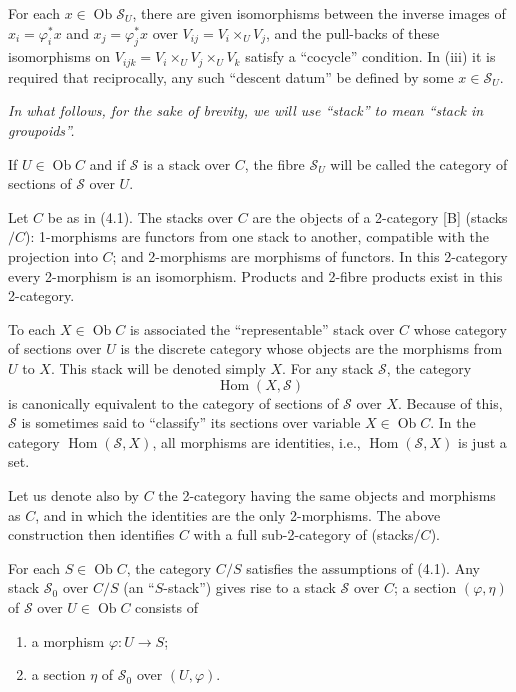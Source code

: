 \documentclass[10pt]{article}
\newcommand{\Hom}{\operatorname{Hom}}
\begin{document}
For each $x\in\operatorname{Ob}\mathscr S_U$, there are given isomorphisms between the inverse images of $x_i=\varphi_i^*x$ and $x_j=\varphi_j^*x$ over $V_{ij}=V_i\times_U V_j$, and the pull-backs of these isomorphisms on $V_{ijk}=V_i\times_U V_j\times_U V_k$ satisfy a ``cocycle'' condition. In (iii) it is required that reciprocally, any such ``descent datum'' be defined by some $x\in\mathscr S_U$.

\emph{In what follows, for the sake of brevity, we will use ``stack'' to mean ``stack in groupoids''.}

If $U\in\operatorname{Ob} C$ and if $\mathscr S$ is a stack over $C$, the fibre $\mathscr S_U$ will be called the category of sections of $\mathscr S$ over $U$.

Let $C$ be as in (4.1). The stacks over $C$ are the objects of a 2-category [B] (stacks$/C$): 1-morphisms are functors from one stack to another, compatible with the projection into $C$; and 2-morphisms are morphisms of functors. In this 2-category every 2-morphism is an isomorphism. Products and 2-fibre products exist in this 2-category.

To each $X\in\operatorname{Ob} C$ is associated the ``representable'' stack over $C$ whose category of sections over $U$ is the discrete category whose objects are the morphisms from $U$ to $X$. This stack will be denoted simply $X$. For any stack $\mathscr S$, the category
\[
\Hom(X,\mathscr S)
\]
is canonically equivalent to the category of sections of $\mathscr S$ over $X$. Because of this, $\mathscr S$ is sometimes said to ``classify'' its sections over variable $X\in\operatorname{Ob} C$. In the category $\Hom(\mathscr S,X)$, all morphisms are identities, i.e., $\Hom(\mathscr S,X)$ is just a set.

Let us denote also by $C$ the 2-category having the same objects and morphisms as $C$, and in which the identities are the only 2-morphisms. The above construction then identifies $C$ with a full sub-2-category of (stacks$/C$).

For each $S\in\operatorname{Ob} C$, the category $C/S$ satisfies the assumptions of (4.1). Any stack $\mathscr S_0$ over $C/S$ (an ``$S$-stack'') gives rise to a stack $\mathscr S$ over $C$; a section $(\varphi,\eta)$ of $\mathscr S$ over $U\in\operatorname{Ob} C$ consists of
\begin{enumerate}[label=(\roman*)]
\item a morphism $\varphi:U\to S$;
\item a section $\eta$ of $\mathscr S_0$ over $(U,\varphi)$.
\end{enumerate}
\end{document}
